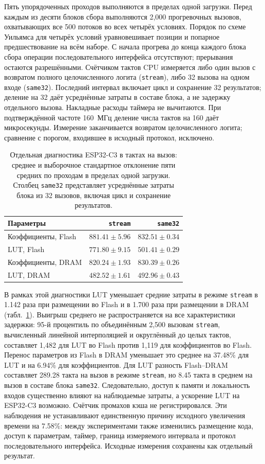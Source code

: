 Пять упорядоченных проходов выполняются в пределах одной загрузки. Перед каждым из десяти блоков сбора выполняются 2,000 прогревочных вызовов, охватывающих все 500 потоков во всех четырёх условиях. Порядок по схеме Уильямса для четырёх условий уравновешивает позиции и попарное предшествование на всём наборе. С начала прогрева до конца каждого блока сбора операции последовательного интерфейса отсутствуют; прерывания остаются разрешёнными. Счётчиком тактов CPU измеряется либо один вызов с возвратом полного целочисленного логита (\texttt{stream}), либо 32 вызова на одном входе (\texttt{same32}). Последний интервал включает цикл и сохранение 32 результатов; деление на 32 даёт усреднённые затраты в составе блока, а не задержку отдельного вызова. Накладные расходы таймера не вычитаются. При подтверждённой частоте 160~МГц деление числа тактов на 160 даёт микросекунды. Измерение заканчивается возвратом целочисленного логита; сравнение с порогом, входившее в исходный протокол, исключено.

\begin{table}[t]
\caption{Отдельная диагностика ESP32-C3 в тактах на вызов: среднее и выборочное стандартное отклонение пяти средних по проходам в пределах одной загрузки. Столбец \texttt{same32} представляет усреднённые затраты блока из 32 вызовов, включая цикл и сохранение результатов.}
\label{tab:c3diagnostic}
\centering\small
\begin{tabular}{lrr}
\toprule
Параметры & \texttt{stream} & \texttt{same32}\\
\midrule
Коэффициенты, Flash & $881.41\pm5.96$ & $832.51\pm0.34$\\
LUT, Flash & $771.80\pm9.15$ & $501.41\pm0.29$\\
Коэффициенты, DRAM & $820.24\pm1.93$ & $830.39\pm0.26$\\
LUT, DRAM & $482.52\pm1.61$ & $492.96\pm0.43$\\
\bottomrule
\end{tabular}
\end{table}

В рамках этой диагностики LUT уменьшает средние затраты в режиме \texttt{stream} в 1.142 раза при размещении во Flash и в 1.700 раза при размещении в DRAM (табл.~\ref{tab:c3diagnostic}). Выигрыш среднего не распространяется на все характеристики задержки: 95-й процентиль по объединённым 2,500 вызовам \texttt{stream}, вычисленный линейной интерполяцией и округлённый до целых тактов, составляет 1,482 для LUT во Flash против 1,119 для коэффициентов во Flash. Перенос параметров из Flash в DRAM уменьшает это среднее на 37.48\% для LUT и на 6.94\% для коэффициентов. Для LUT разность Flash--DRAM составляет 289.28 такта на вызов в режиме \texttt{stream}, но 8.45 такта в среднем на вызов в составе блока \texttt{same32}. Следовательно, доступ к памяти и локальность входов существенно влияют на наблюдаемые затраты, а ускорение LUT на ESP32-C3 возможно. Счётчик промахов кэша не регистрировался. Эти наблюдения не устанавливают единственную причину исходного увеличения времени на 7.58\%: между экспериментами также изменились размещение кода, доступ к параметрам, таймер, граница измеряемого интервала и протокол последовательного интерфейса. Исходные измерения сохранены как отдельный результат.

